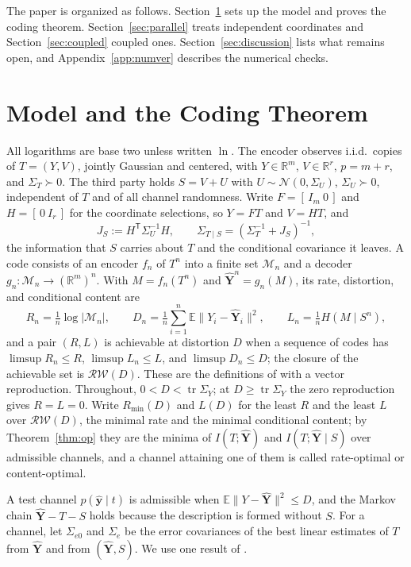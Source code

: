 \documentclass[11pt,onecolumn]{IEEEtran}
\newcommand{\E}{\mathbb{E}}
\newcommand{\R}{\mathbb{R}}
\newcommand{\tr}{\operatorname{tr}}
\newcommand{\hYv}{\hat{\mathbf Y}}
\newcommand{\RW}{\mathcal{R}\!\mathcal{W}}
\begin{document}
The paper is organized as follows. Section~\ref{sec:model} sets up the
model and proves the coding theorem. Section~\ref{sec:parallel} treats
independent coordinates and Section~\ref{sec:coupled} coupled ones.
Section~\ref{sec:discussion} lists what remains open, and
Appendix~\ref{app:numver} describes the numerical checks.

\section{Model and the Coding Theorem}
\label{sec:model}

All logarithms are base two unless written $\ln$. The encoder observes
i.i.d.\ copies of $T=(Y,V)$, jointly Gaussian and centered, with
$Y\in\R^m$, $V\in\R^r$, $p=m+r$, and $\Sigma_T\succ0$. The third party
holds $S=V+U$ with $U\sim\mathcal N(0,\Sigma_U)$, $\Sigma_U\succ0$,
independent of $T$ and of all channel randomness. Write $F=[\,I_m\ 0\,]$
and $H=[\,0\ I_r\,]$ for the coordinate selections, so $Y=FT$ and $V=HT$,
and
\[
J_S:=H^{\mathsf T}\Sigma_U^{-1}H,
\qquad
\Sigma_{T\mid S}=(\Sigma_T^{-1}+J_S)^{-1},
\]
the information that $S$ carries about $T$ and the conditional covariance
it leaves. A code consists of an encoder $f_n$ of $T^n$ into a finite set
$\mathcal M_n$ and a decoder $g_n:\mathcal M_n\to(\R^m)^n$. With
$M=f_n(T^n)$ and $\hYv^n=g_n(M)$, its rate, distortion, and conditional
content are
\[
R_n=\tfrac1n\log|\mathcal M_n|,\qquad
D_n=\tfrac1n\sum_{i=1}^n\E\|Y_i-\hYv_i\|^2,\qquad
L_n=\tfrac1nH(M\mid S^n),
\]
and a pair $(R,L)$ is achievable at distortion $D$ when a sequence of codes
has $\limsup R_n\le R$, $\limsup L_n\le L$, and $\limsup D_n\le D$; the
closure of the achievable set is $\RW(D)$. These are the definitions of
\cite[Section~II]{bond2026tit} with a vector reproduction. Throughout,
$0<D<\tr\Sigma_Y$; at $D\ge\tr\Sigma_Y$ the zero reproduction gives
$R=L=0$. Write $R_{\min}(D)$ and $L(D)$ for the least $R$ and the least $L$
over $\RW(D)$, the minimal rate and the minimal conditional content; by
Theorem~\ref{thm:op} they are the minima of $I(T;\hYv)$ and
$I(T;\hYv\mid S)$ over admissible channels, and a channel attaining one of
them is called rate-optimal or content-optimal.

A test channel $p(\hat{\mathbf y}\mid t)$ is admissible when
$\E\|Y-\hYv\|^2\le D$, and the Markov chain $\hYv-T-S$ holds because the
description is formed without $S$. For a channel, let $\Sigma_{e0}$ and
$\Sigma_e$ be the error covariances of the best linear estimates of $T$
from $\hYv$ and from $(\hYv,S)$. We use one result of \cite{bond2026tit}.
\end{document}
